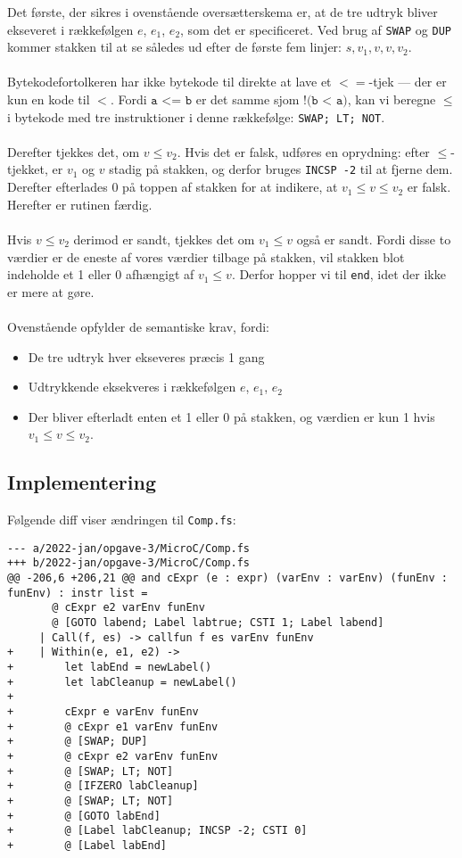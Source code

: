  Det første, der sikres i ovenstående oversætterskema er, at de tre udtryk bliver ekseveret i rækkefølgen $e$, $e_1$, $e_2$, som det er specificeret. Ved brug af \texttt{SWAP} og \texttt{DUP} kommer stakken til at se således ud efter de første fem linjer: $s, v_1, v, v, v_2$.
 \\\\
 Bytekodefortolkeren har ikke bytekode til direkte at lave et $<=$-tjek --- der er kun en kode til $<$. Fordi $\texttt{a <= b}$ er det samme sjom $\texttt{!(b < a)}$, kan vi beregne $\leq$ i bytekode med tre instruktioner i denne rækkefølge: \texttt{SWAP; LT; NOT}.
 \\\\
 Derefter tjekkes det, om $v \leq v_2$. Hvis det er falsk, udføres en oprydning: efter $\leq$-tjekket, er $v_1$ og $v$ stadig på stakken, og derfor bruges \texttt{INCSP -2} til at fjerne dem. Derefter efterlades 0 på toppen af stakken for at indikere, at $v_1 \leq v \leq v_2$ er falsk. Herefter er rutinen færdig.
 \\\\
 Hvis $v \leq v_2$ derimod er sandt, tjekkes det om $v_1 \leq v$ også er sandt. Fordi disse to værdier er de eneste af vores værdier tilbage på stakken, vil stakken blot indeholde et 1 eller 0 afhængigt af $v_1 \leq v$. Derfor hopper vi til \texttt{end}, idet der ikke er mere at gøre.
 \\\\
 Ovenstående opfylder de semantiske krav, fordi:
 \begin{itemize}
     \item De tre udtryk hver ekseveres præcis 1 gang
     \item Udtrykkende eksekveres i rækkefølgen $e$, $e_1$, $e_2$
     \item Der bliver efterladt enten et 1 eller 0 på stakken, og værdien er kun 1 hvis $v_1 \leq v \leq v_2$.
 \end{itemize}

\subsection{Implementering}

Følgende diff viser ændringen til \texttt{Comp.fs}:

\begin{verbatim}
--- a/2022-jan/opgave-3/MicroC/Comp.fs
+++ b/2022-jan/opgave-3/MicroC/Comp.fs
@@ -206,6 +206,21 @@ and cExpr (e : expr) (varEnv : varEnv) (funEnv : funEnv) : instr list =
       @ cExpr e2 varEnv funEnv
       @ [GOTO labend; Label labtrue; CSTI 1; Label labend]
     | Call(f, es) -> callfun f es varEnv funEnv
+    | Within(e, e1, e2) ->
+        let labEnd = newLabel()
+        let labCleanup = newLabel()
+
+        cExpr e varEnv funEnv
+        @ cExpr e1 varEnv funEnv
+        @ [SWAP; DUP]
+        @ cExpr e2 varEnv funEnv
+        @ [SWAP; LT; NOT]
+        @ [IFZERO labCleanup]
+        @ [SWAP; LT; NOT]
+        @ [GOTO labEnd]
+        @ [Label labCleanup; INCSP -2; CSTI 0]
+        @ [Label labEnd]
\end{verbatim}

